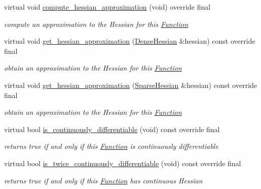\begin{Indent}
\begin{DoxyCompactItemize}
virtual void \mbox{\hyperlink{class_s_m_spp__di__unipi__it_1_1_linear_function_a4aab1ee65194b8af72eb1c122205c707}{compute\+\_\+hessian\+\_\+approximation}} (void) override final
\begin{DoxyCompactList}\small\item\em compute an approximation to the Hessian for this \mbox{\hyperlink{class_s_m_spp__di__unipi__it_1_1_function}{Function}} \end{DoxyCompactList}\item 
virtual void \mbox{\hyperlink{class_s_m_spp__di__unipi__it_1_1_linear_function_a7ebd74c022ea1a7747ba8efe72d3e512}{get\+\_\+hessian\+\_\+approximation}} (\mbox{\hyperlink{class_s_m_spp__di__unipi__it_1_1_c15_function_ae7dd5ecf6e8711dc10787bb8d80b355b}{Dense\+Hessian}} \&hessian) const override final
\begin{DoxyCompactList}\small\item\em obtain an approximation to the Hessian for this \mbox{\hyperlink{class_s_m_spp__di__unipi__it_1_1_function}{Function}} \end{DoxyCompactList}\item 
virtual void \mbox{\hyperlink{class_s_m_spp__di__unipi__it_1_1_linear_function_a5950a5291f5ffab2cc9c42e33b7e6f27}{get\+\_\+hessian\+\_\+approximation}} (\mbox{\hyperlink{class_s_m_spp__di__unipi__it_1_1_c15_function_af95b7c5c0969f493222b30b17aa58515}{Sparse\+Hessian}} \&hessian) const override final
\begin{DoxyCompactList}\small\item\em obtain an approximation to the Hessian for this \mbox{\hyperlink{class_s_m_spp__di__unipi__it_1_1_function}{Function}} \end{DoxyCompactList}\item 
virtual bool \mbox{\hyperlink{class_s_m_spp__di__unipi__it_1_1_linear_function_ae8dc9a7225895704afe3802754f4fd75}{is\+\_\+continuously\+\_\+differentiable}} (void) const override final
\begin{DoxyCompactList}\small\item\em returns true if and only if this \mbox{\hyperlink{class_s_m_spp__di__unipi__it_1_1_function}{Function}} is continuously differentiable \end{DoxyCompactList}\item 
virtual bool \mbox{\hyperlink{class_s_m_spp__di__unipi__it_1_1_linear_function_a272aecba91401ca432dfa79ad6091c3e}{is\+\_\+twice\+\_\+continuously\+\_\+differentiable}} (void) const override final
\begin{DoxyCompactList}\small\item\em returns true if and only if this \mbox{\hyperlink{class_s_m_spp__di__unipi__it_1_1_function}{Function}} has continuous Hessian \end{DoxyCompactList}\item 

\end{DoxyCompactItemize}
\end{Indent}
